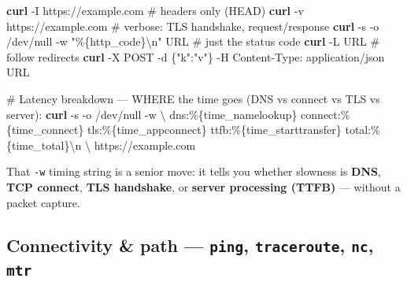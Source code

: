 \documentclass[11pt]{article}
\newenvironment{Shaded}{\begin{snugshade}}{\end{snugshade}}
\newcommand{\AttributeTok}[1]{\textcolor[rgb]{0.16,0.50,0.73}{#1}}
\newcommand{\CommentTok}[1]{\textcolor[rgb]{0.48,0.49,0.49}{#1}}
\newcommand{\DataTypeTok}[1]{\textcolor[rgb]{0.16,0.50,0.73}{#1}}
\newcommand{\ExtensionTok}[1]{\textcolor[rgb]{0.00,0.60,1.00}{\textbf{#1}}}
\newcommand{\NormalTok}[1]{\textcolor[rgb]{0.81,0.81,0.76}{#1}}
\newcommand{\StringTok}[1]{\textcolor[rgb]{0.96,0.31,0.31}{#1}}
\begin{document}
\begin{Shaded}
\begin{Highlighting}[]
\ExtensionTok{curl} \AttributeTok{{-}I}\NormalTok{ https://example.com               }\CommentTok{\# headers only (HEAD)}
\ExtensionTok{curl} \AttributeTok{{-}v}\NormalTok{ https://example.com               }\CommentTok{\# verbose: TLS handshake, request/response}
\ExtensionTok{curl} \AttributeTok{{-}s} \AttributeTok{{-}o}\NormalTok{ /dev/null }\AttributeTok{{-}w} \StringTok{"\%\{http\_code\}\textbackslash{}n"}\NormalTok{ URL   }\CommentTok{\# just the status code}
\ExtensionTok{curl} \AttributeTok{{-}L}\NormalTok{ URL                               }\CommentTok{\# follow redirects}
\ExtensionTok{curl} \AttributeTok{{-}X}\NormalTok{ POST }\AttributeTok{{-}d} \StringTok{\textquotesingle{}\{"k":"v"\}\textquotesingle{}} \AttributeTok{{-}H} \StringTok{\textquotesingle{}Content{-}Type: application/json\textquotesingle{}}\NormalTok{ URL}

\CommentTok{\# Latency breakdown — WHERE the time goes (DNS vs connect vs TLS vs server):}
\ExtensionTok{curl} \AttributeTok{{-}s} \AttributeTok{{-}o}\NormalTok{ /dev/null }\AttributeTok{{-}w} \DataTypeTok{\textbackslash{}}
 \StringTok{\textquotesingle{}dns:\%\{time\_namelookup\} connect:\%\{time\_connect\} tls:\%\{time\_appconnect\} ttfb:\%\{time\_starttransfer\} total:\%\{time\_total\}\textbackslash{}n\textquotesingle{}} \DataTypeTok{\textbackslash{}}
\NormalTok{ https://example.com}
\end{Highlighting}
\end{Shaded}

That \texttt{-w} timing string is a senior move: it tells you whether slowness is \textbf{DNS}, \textbf{TCP connect}, \textbf{TLS handshake}, or \textbf{server processing (TTFB)} --- without a packet capture.

\subsection{\texorpdfstring{Connectivity \& path --- \texttt{ping}, \texttt{traceroute}, \texttt{nc}, \texttt{mtr}}{Connectivity \& path --- ping, traceroute, nc, mtr}}\label{connectivity--path--ping-traceroute-nc-mtr}

\end{document}
